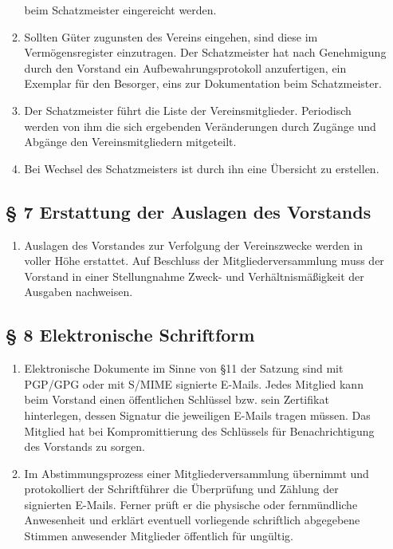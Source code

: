 \documentclass[10pt,a4paper]{article}
\begin{document}
\begin{enumerate}
\begin{enumerate}
    beim Schatzmeister eingereicht werden.
\item Sollten Güter zugunsten des Vereins eingehen, sind diese im
    Vermögensregister einzutragen. Der Schatzmeister hat nach
    Genehmigung durch den Vorstand ein Aufbewahrungsprotokoll
    anzufertigen, ein Exemplar für den Besorger, eins zur
    Dokumentation beim Schatzmeister.
\item Der Schatzmeister führt die Liste der Vereinsmitglieder.
    Periodisch werden von ihm die sich ergebenden Veränderungen
    durch Zugänge und Abgänge den Vereinsmitgliedern mitgeteilt.
\item Bei Wechsel des Schatzmeisters ist durch ihn eine Übersicht zu erstellen.
\end{enumerate}
%
%
\subsection*{§ 7 Erstattung der Auslagen des Vorstands}
\begin{enumerate}
\item Auslagen des Vorstandes zur Verfolgung der Vereinszwecke werden
    in voller Höhe erstattet. Auf Beschluss der Mitgliederversammlung
    muss der Vorstand in einer Stellungnahme Zweck- und Verhältnis\-mäßigkeit
    der Ausgaben nachweisen.
\end{enumerate}
%
%
\subsection*{§ 8 Elektronische Schriftform}
\begin{enumerate}
\item Elektronische Dokumente im Sinne von §11 der Satzung sind mit PGP/GPG
    oder mit S/MIME signierte E-Mails. Jedes Mitglied kann beim Vorstand
    einen öffentlichen Schlüssel bzw. sein Zertifikat hinterlegen, dessen
    Signatur die jeweiligen E-Mails tragen müssen. Das Mitglied hat bei
    Kompromittierung des Schlüssels für Benachrichtigung des Vorstands
    zu sorgen.
\item Im Abstimmungsprozess einer Mitgliederversammlung
    übernimmt und protokolliert der Schriftführer die Überprüfung und
    Zählung der signierten E-Mails. Ferner prüft er die physische oder fernmündliche Anwesenheit und
    erklärt eventuell vorliegende schriftlich abgegebene Stimmen anwesender
    Mitglieder öffentlich für ungültig.
\end{enumerate}


\end{enumerate}
\end{document}
